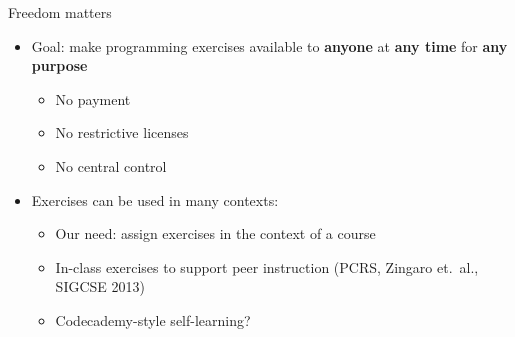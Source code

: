 \documentclass{beamer}
\begin{document}

\begin{frame}{Freedom matters}

\begin{itemize}
  \item Goal: make programming exercises available to {\bf anyone} at {\bf any time} for {\bf any purpose}
  \begin{itemize}
    \item No payment
    \item No restrictive licenses
    \item No central control
  \end{itemize}
  \item Exercises can be used in many contexts:
  \begin{itemize}
    \item Our need: assign exercises in the context of a course
    \item In-class exercises to support peer instruction
          (PCRS, Zingaro et.\ al., SIGCSE 2013)
    \item Codecademy-style self-learning?
  \end{itemize}
\end{itemize}

\end{frame}
\end{document}
